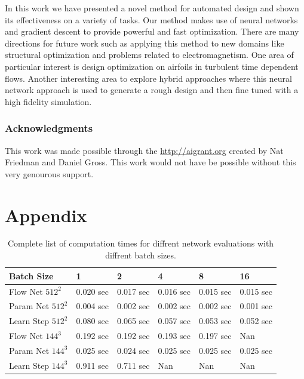 \documentclass{article} %
\begin{document}
In this work we have presented a novel method for automated design and shown its effectiveness on a variety of tasks. Our method makes use of neural networks and gradient descent to provide powerful and fast optimization. There are many directions for future work such as applying this method to new domains like structural optimization and problems related to electromagnetism. One area of particular interest is design optimization on airfoils in turbulent time dependent flows. Another interesting area to explore hybrid approaches where this neural network approach is used to generate a rough design and then fine tuned with a high fidelity simulation.


\subsubsection*{Acknowledgments}

This work was made possible through the \url{http://aigrant.org} created by Nat Friedman and Daniel Gross. This work would not have be possible without this very genourous support.




\section{Appendix}

\begin{table}[t]
\caption{Complete list of computation times for diffrent network evaluations with diffrent batch sizes.}
\label{computation_table}
\begin{center}
\begin{tabular}{l|lllll}
Batch Size & 1 & 2 & 4 & 8 & 16 \\ \hline 
Flow Net $512^2$ & 0.020 sec & 0.017 sec & 0.016 sec & 0.015 sec & 0.015 sec \\ 
Param Net $512^2$ & 0.004 sec & 0.002 sec & 0.002 sec & 0.002 sec & 0.001 sec \\ 
Learn Step $512^2$ & 0.080 sec & 0.065 sec & 0.057 sec & 0.053 sec & 0.052 sec \\ 
Flow Net $144^3$ & 0.192 sec & 0.192 sec & 0.193 sec & 0.197 sec & Nan \\ 
Param Net $144^3$ & 0.025 sec & 0.024 sec & 0.025 sec & 0.025 sec & 0.025 sec \\ 
Learn Step $144^3$ & 0.911 sec & 0.711 sec & Nan & Nan & Nan \\ 
\end{tabular}
\end{center}
\end{table}
\end{document}
